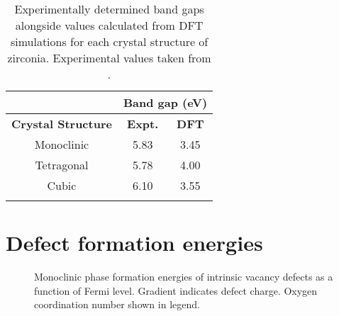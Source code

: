 \begin{table}[ht] %
\onehalfspacing
\centering
\caption[Experimentally determined band gaps alongside values calculated from DFT simulations for each crystal structure of zirconia.]{Experimentally determined band gaps alongside values calculated from DFT simulations for each crystal structure of zirconia. Experimental values taken from \cite{French1994}.}
\begin{tabular}{ccc}
{\bf }                                       & \multicolumn{2}{c}{{\bf Band gap (eV)}}      \\ \hline
\multicolumn{1}{c}{{\bf Crystal Structure}} & \multicolumn{1}{c}{{\bf Expt.}} & {\bf DFT} \\ \hline
\multicolumn{1}{c}{Monoclinic}              & \multicolumn{1}{c}{5.83}        & 3.45      \\
\multicolumn{1}{c}{Tetragonal}              & \multicolumn{1}{c}{5.78}        & 4.00      \\
\multicolumn{1}{c}{Cubic}                   & \multicolumn{1}{c}{6.10}         &   3.55 \\ \hline
\label{table:bandgap}
\end{tabular}
\end{table}

\section{Defect formation energies}

\begin{figure}[ht]
\begin{center}
		\caption{Monoclinic phase formation energies of intrinsic vacancy defects as a function of Fermi level. Gradient indicates defect charge. Oxygen coordination number shown in legend.}
		\label{figure:monovacancies}
	\end{center}
\end{figure}



